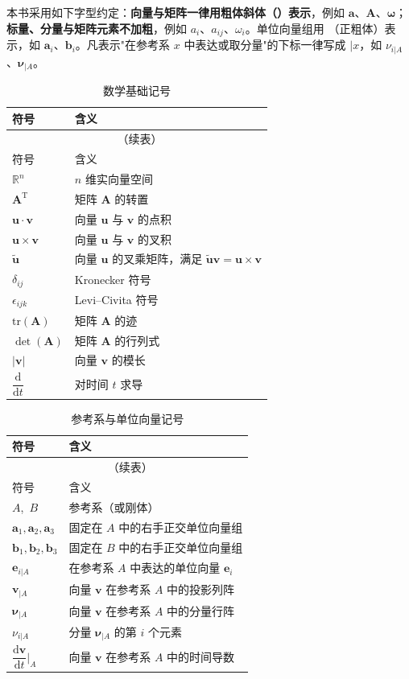 本书采用如下字型约定：\textbf{向量与矩阵一律用粗体斜体（$\bm{}$）表示}，例如 $\bm{a}$、$\bm{A}$、$\bm{\omega}$；\textbf{标量、分量与矩阵元素不加粗}，例如 $a_i$、$a_{ij}$、$\omega_i$。单位向量组用 $\mathbf{}$（正粗体）表示，如 $\mathbf{a}_i$、$\mathbf{b}_i$。凡表示"在参考系 $x$ 中表达或取分量"的下标一律写成 $|x$，如 $\nu_{i|A}$、$\bm{\nu}_{|A}$。


\begin{longtable}{ll}
	\caption{数学基础记号}\label{tab:符号说明:数学记号}\\
	\toprule
	符号 & 含义 \\
	\midrule
	\endfirsthead
	\multicolumn{2}{c}{\tablename~\thetable{}（续表）}\\
	\toprule
	符号 & 含义 \\
	\midrule
	\endhead
	$\mathbb{R}^{n}$ & $n$ 维实向量空间 \\
	$\bm{A}^{\mathrm{T}}$ & 矩阵 $\bm{A}$ 的转置 \\
	$\bm{u}\cdot\bm{v}$ & 向量 $\bm{u}$ 与 $\bm{v}$ 的点积 \\
	$\bm{u}\times\bm{v}$ & 向量 $\bm{u}$ 与 $\bm{v}$ 的叉积 \\
	$\tilde{\bm{u}}$ & 向量 $\bm{u}$ 的叉乘矩阵，满足 $\tilde{\bm{u}}\bm{v}=\bm{u}\times\bm{v}$ \\
	$\delta_{ij}$ & Kronecker 符号 \\
	$\epsilon_{ijk}$ & Levi--Civita 符号 \\
	$\mathrm{tr}(\bm{A})$ & 矩阵 $\bm{A}$ 的迹 \\
	$\det(\bm{A})$ & 矩阵 $\bm{A}$ 的行列式 \\
	$\left|\bm{v}\right|$ & 向量 $\bm{v}$ 的模长 \\
	$\dfrac{\mathrm{d}}{\mathrm{d}t}$ & 对时间 $t$ 求导 \\
	\bottomrule
\end{longtable}

\begin{longtable}{ll}
	\caption{参考系与单位向量记号}\label{tab:符号说明:参考系}\\
	\toprule
	符号 & 含义 \\
	\midrule
	\endfirsthead
	\multicolumn{2}{c}{\tablename~\thetable{}（续表）}\\
	\toprule
	符号 & 含义 \\
	\midrule
	\endhead
	$A$,\, $B$ & 参考系（或刚体） \\
	$\mathbf{a}_1,\mathbf{a}_2,\mathbf{a}_3$ & 固定在 $A$ 中的右手正交单位向量组 \\
	$\mathbf{b}_1,\mathbf{b}_2,\mathbf{b}_3$ & 固定在 $B$ 中的右手正交单位向量组 \\
	$\mathbf{e}_{i|A}$ & 在参考系 $A$ 中表达的单位向量 $\mathbf{e}_i$ \\
	$\mathbf{v}_{|A}$ & 向量 $\bm{v}$ 在参考系 $A$ 中的投影列阵 \\
	$\bm{\nu}_{|A}$ & 向量 $\bm{v}$ 在参考系 $A$ 中的分量行阵 \\
	$\nu_{i|A}$ & 分量 $\bm{\nu}_{|A}$ 的第 $i$ 个元素 \\
	$\dfrac{\mathrm{d}\bm{v}}{\mathrm{d}t}\Big|_{A}$ & 向量 $\bm{v}$ 在参考系 $A$ 中的时间导数 \\
	\bottomrule
\end{longtable}

